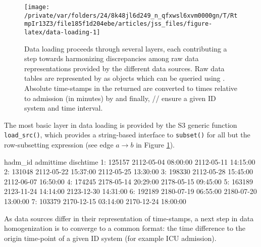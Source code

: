 \documentclass[
  notitle]{jss}
\begin{document}
\begin{CodeChunk}
\begin{figure}

{\centering \texttt{[image: /private/var/folders/24/8k48jl6d249\_n\_qfxwsl6xvm0000gn/T/RtmpIr13Z3/file185f1d204ebe/articles/jss\_files/figure-latex/data-loading-1]} 

}

\caption{Data loading proceeds through several layers, each contributing a step towards harmonizing discrepancies among raw data representations provided by the different data sources. Raw data tables are represented by  as  objects which can be queried using . Absolute time-stamps in the returned  are converted to times relative to admission (in minutes) by  and finally, /\allowbreak{}/\allowbreak{} ensure a given ID system and time interval.}\label{fig:data-loading}
\end{figure}
\end{CodeChunk}

The most basic layer in data loading is provided by the S3 generic
function \texttt{load\_src()}, which provides a string-based interface
to \texttt{subset()} for all but the row-subsetting expression (see edge
\(a \to b\) in Figure \ref{fig:data-loading}).

\begin{CodeChunk}
\begin{CodeOutput}
   hadm_id           admittime           dischtime
1:  125157 2112-05-04 08:00:00 2112-05-11 14:15:00
2:  131048 2112-05-22 15:37:00 2112-05-25 13:30:00
3:  198330 2112-05-28 15:45:00 2112-06-07 16:50:00
4:  174245 2178-05-14 20:29:00 2178-05-15 09:45:00
5:  163189 2123-11-24 14:14:00 2123-12-30 14:31:00
6:  192189 2180-07-19 06:55:00 2180-07-20 13:00:00
7:  103379 2170-12-15 03:14:00 2170-12-24 18:00:00
\end{CodeOutput}
\end{CodeChunk}

As data sources differ in their representation of time-stamps, a next
step in data homogenization is to converge to a common format: the time
difference to the origin time-point of a given ID system (for example
ICU admission).
\end{document}
